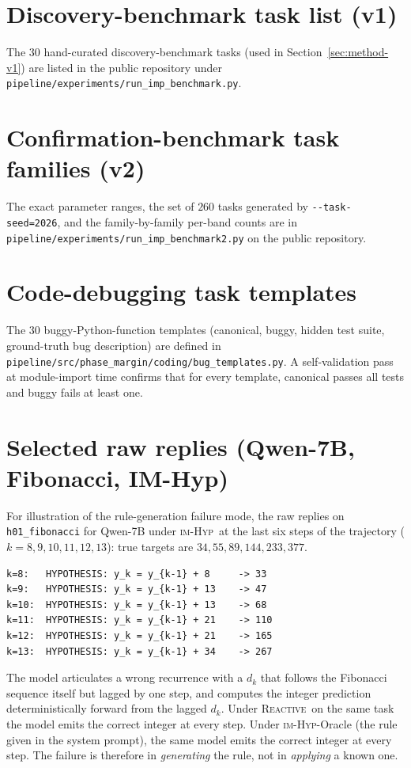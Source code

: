 \documentclass[11pt]{article}
\newcommand{\imhyp}{\textsc{im-Hyp}}
\newcommand{\reactive}{\textsc{Reactive}}
\begin{document}
\appendix

\section{Discovery-benchmark task list (v1)}
\label{app:tasks}
The 30 hand-curated discovery-benchmark tasks (used in
Section~\ref{sec:method-v1}) are listed in the public repository
under \verb|pipeline/experiments/run_imp_benchmark.py|.

\section{Confirmation-benchmark task families (v2)}
\label{app:families}
The exact parameter ranges, the set of $260$ tasks generated by
\verb|--task-seed=2026|, and the family-by-family per-band counts
are in \verb|pipeline/experiments/run_imp_benchmark2.py| on the
public repository.

\section{Code-debugging task templates}
\label{app:code}
The $30$ buggy-Python-function templates (canonical, buggy,
hidden test suite, ground-truth bug description) are defined in
\verb|pipeline/src/phase_margin/coding/bug_templates.py|.  A
self-validation pass at module-import time confirms that for
every template, canonical passes all tests and buggy fails at
least one.

\section{Selected raw replies (Qwen-7B, Fibonacci, IM-Hyp)}
\label{app:replies}
For illustration of the rule-generation failure mode, the raw
replies on \texttt{h01\_fibonacci} for Qwen-7B under \imhyp\ at
the last six steps of the trajectory ($k = 8, 9, 10, 11, 12, 13$):
true targets are $34, 55, 89, 144, 233, 377$.

\begin{Verbatim}[fontsize=\small,frame=single]
k=8:   HYPOTHESIS: y_k = y_{k-1} + 8     -> 33
k=9:   HYPOTHESIS: y_k = y_{k-1} + 13    -> 47
k=10:  HYPOTHESIS: y_k = y_{k-1} + 13    -> 68
k=11:  HYPOTHESIS: y_k = y_{k-1} + 21    -> 110
k=12:  HYPOTHESIS: y_k = y_{k-1} + 21    -> 165
k=13:  HYPOTHESIS: y_k = y_{k-1} + 34    -> 267
\end{Verbatim}

The model articulates a wrong recurrence with a $d_k$ that
follows the Fibonacci sequence itself but lagged by one step,
and computes the integer prediction deterministically forward
from the lagged $d_k$.  Under \reactive\ on the same task the
model emits the correct integer at every step.  Under
\imhyp{}-Oracle (the rule given in the system prompt), the same
model emits the correct integer at every step.  The failure is
therefore in \emph{generating} the rule, not in \emph{applying}
a known one.
\end{document}
